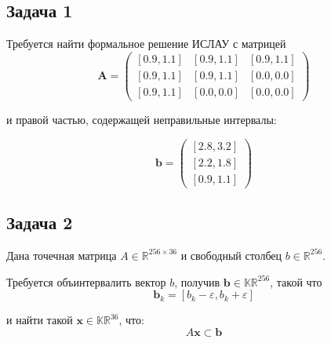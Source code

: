 \subsection{Задача 1}

Требуется найти формальное решение ИСЛАУ с матрицей
\begin{equation}
    \mathbf{A}=
    \begin{pmatrix}
    [0.9, 1.1] & [0.9, 1.1] & [0.9, 1.1] \\
    [0.9, 1.1] & [0.9, 1.1] & [0.0, 0.0] \\
    [0.9, 1.1] & [0.0, 0.0] & [0.0, 0.0] 
    \end{pmatrix}
\end{equation}

и правой частью, содержащей неправильные интервалы:

\begin{equation}
\mathbf{b}=
\begin{pmatrix}
[2.8, 3.2] \\
[2.2, 1.8] \\
[0.9, 1.1]
\end{pmatrix}
\end{equation}

\subsection{Задача 2}

Дана точечная матрица $A \in \mathbb{R}^{256 \times 36}$ и свободный столбец $b \in \mathbb{R}^{256}$.

Требуется объинтервалить вектор $b$, получив $\mathbf{b} \in \mathbb{KR}^{256}$, такой что 
\begin{equation}
\mathbf{b}_k = [b_k - \varepsilon, b_k + \varepsilon]
\end{equation}

и найти такой $\mathbf{x} \in \mathbb{KR}^{36}$, что:
\begin{equation}
A\mathbf{x} \subset \mathbf{b}
\end{equation}